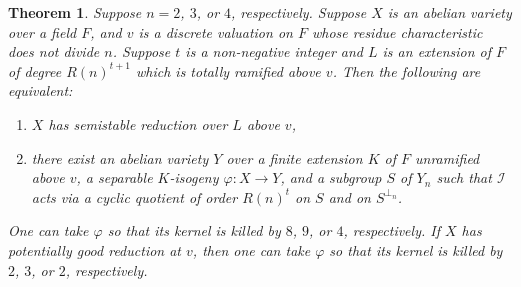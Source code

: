 \documentclass{amsart}
\def\R{{\mathbf R}}
\def\I{{\mathcal I}}
\def\R{R}
\newtheorem{thm}{Theorem}[section]
\theoremstyle{definition}
\begin{document}
\begin{thm}
\label{bothways}
Suppose $n = 2$, $3$, or $4$, respectively. Suppose 
$X$ is an abelian variety over a field $F$, and 
$v$ is a discrete valuation on $F$ whose residue characteristic 
does not divide $n$. 
Suppose $t$ is a non-negative integer and
$L$ is an extension of $F$ of degree $\R(n)^{t+1}$ which 
is totally ramified above $v$. 
Then the following are equivalent:
\begin{enumerate}
\item[(i)] $X$ has semistable reduction over $L$ above $v$,
\item[(ii)] there exist an abelian variety $Y$ over a finite
extension $K$ of $F$ unramified above $v$, a separable $K$-isogeny
$\varphi : X \to Y$, and a subgroup 
$S$ of $Y_n$ such that 
$\I$ acts via a cyclic quotient of order $\R(n)^t$ on $S$ and 
on $S^{\perp_n}$.
\end{enumerate}
One can take $\varphi$ so that
its kernel is killed by $8$, $9$, or $4$, respectively.
If $X$ has potentially good reduction at $v$, then 
one can take $\varphi$ so that its kernel is killed by $2$,
$3$, or $2$, respectively.
\end{thm}
\end{document}
